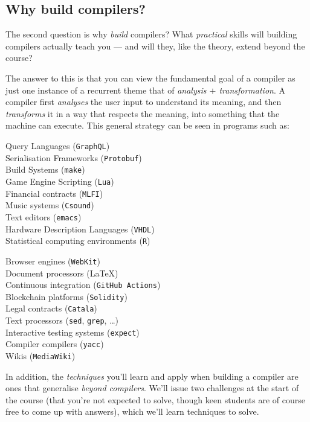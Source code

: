 \subsection{Why build compilers?}
The second question is why \emph{build} compilers? What \emph{practical} skills will building compilers actually teach you --- and will they, like the theory, extend beyond the course?

The answer to this is that you can view the fundamental goal of a compiler as just one instance of a recurrent theme that of \emph{analysis $+$ transformation}. A compiler first \emph{analyses} the user input to understand its meaning, and then \emph{transforms} it in a way that respects the meaning, into something that the machine can execute. This general strategy can be seen in programs such as:

\begin{minipage}[t]{0.5\textwidth}
Query Languages (\texttt{GraphQL})\\
Serialisation Frameworks (\texttt{Protobuf})\\
Build Systems (\texttt{make})\\
Game Engine Scripting (\texttt{Lua}) \\
Financial contracts (\texttt{MLFI})\\
Music systems (\texttt{Csound}) \\
Text editors (\texttt{emacs})\\
Hardware Description Languages (\texttt{VHDL}) \\
Statistical computing environments (\texttt{R})\\
\end{minipage}%
\begin{minipage}[t]{0.5\textwidth}
Browser engines (\texttt{WebKit})\\
Document processors (\LaTeX)\\
Continuous integration (\texttt{GitHub Actions})\\
Blockchain platforms (\texttt{Solidity})\\
Legal contracts (\texttt{Catala})\\
Text processors (\texttt{sed}, \texttt{grep}, \ldots)\\
Interactive testing systems (\texttt{expect})\\
Compiler compilers (\texttt{yacc})\\
Wikis (\texttt{MediaWiki})
\end{minipage}

In addition, the \emph{techniques} you'll learn and apply when building a compiler are ones that generalise \emph{beyond compilers}. We'll issue two challenges at the start of the course (that you're not expected to solve, though keen students are of course free to come up with answers), which we'll learn techniques to solve.

